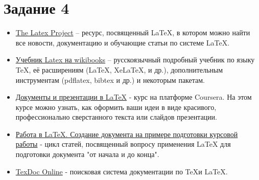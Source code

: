 \documentclass[a4paper,12pt]{article} %
\begin{document}
\section{Задание 4}

\begin{itemize}
\item \href{https://www.latex-project.org/}{The Latex Project} – ресурс, посвященный \LaTeX, в котором можно найти все новости, документацию и обучающие статьи по системе \LaTeX.
\item \href{https://ru.wikibooks.org/wiki/LaTeX}{Учебник Latex на wikibooks} – русскоязычный подробный учебник по языку TeX, её расширениям (LaTeX, XeLaTeX, и др.), дополнительным инструментам (pdflatex, bibtex и др.) и некоторым пакетам.
\item \href{https://www.coursera.org/learn/latex}{Документы и презентации в LaTeX} - курс на платформе Coursera. На этом курсе можно узнать, как оформить ваши идеи в виде красивого, профессионально сверстанного текста или слайдов презентации.
\item \href{https://www.ibm.com/developerworks/ru/library/latex_tutorial_01/index.html}{Работа в LaTeX. Создание документа на примере подготовки курсовой работы} - цикл статей, посвященный вопросу применения LaTeX для подготовки документа "от начала и до конца".
\item \href{http://www.texdoc.net/}{TexDoc Online} - поисковая система документации по \TeX и \LaTeX.
\end{itemize}
\end{document}
